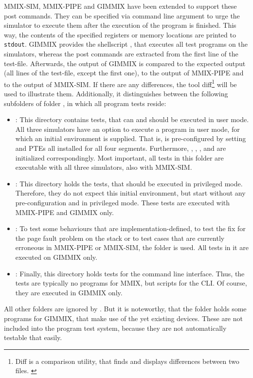 MMIX-SIM, MMIX-PIPE and GIMMIX have been extended to support these post commands. They can be specified via command line argument to urge the simulator to execute them after the execution of the program is finished. This way, the contents of the specified registers or memory locations are printed to {\tt stdout}. GIMMIX provides the shellscript , that executes all test programs on the simulators, whereas the post commands are extracted from the first line of the test-file. Afterwards, the output of GIMMIX is compared to the expected output (all lines of the test-file, except the first one), to the output of MMIX-PIPE and to the output of MMIX-SIM. If there are any differences, the tool diff\footnote{Diff is a comparison utility, that finds and displays differences between two files. \citep{gldiff}} will be used to illustrate them. Additionally, it distinguishes between the following subfolders of folder , in which all program tests reside:
\begin{itemize}
	\item {}: This directory contains tests, that can and should be executed in user mode. All three simulators have an option to execute a program in user mode, for which an initial environment is supplied. That is,  is pre-configured by setting  and PTEs all installed for all four segments. Furthermore, , , ,  and  are initialized correspondingly. Most important, all tests in this folder are executable with all three simulators, \ie also with MMIX-SIM.
	\item {}: This directory holds the tests, that should be executed in privileged mode. Therefore, they do not expect this initial environment, but start without any pre-configuration and in privileged mode. These tests are executed with MMIX-PIPE and GIMMIX only.
	\item {}: To test some behaviours that are implementation-defined, to test the fix for the page fault problem on the stack or to test cases that are currently erroneous in MMIX-PIPE or MMIX-SIM, the folder  is used. All tests in it are executed on GIMMIX only.
	\item {}: Finally, this directory holds tests for the command line interface. Thus, the tests are typically no programs for MMIX, but scripts for the CLI. Of course, they are executed in GIMMIX only.
\end{itemize}
All other folders are ignored by . But it is noteworthy, that the folder  holds some programs for GIMMIX, that make use of the yet existing devices. These are not included into the program test system, because they are not automatically testable that easily.

